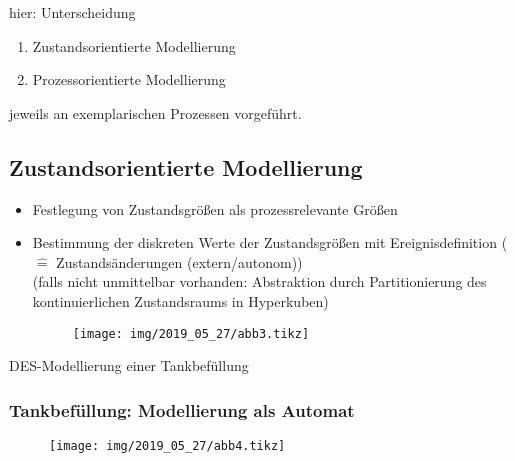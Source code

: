 hier: Unterscheidung
\begin{enumerate}
	\item Zustandsorientierte Modellierung
	\item Prozessorientierte Modellierung
\end{enumerate}
jeweils an exemplarischen Prozessen vorgeführt.

\subsection{Zustandsorientierte Modellierung}
\begin{itemize}
	\item Festlegung von Zustandsgrößen  als prozessrelevante Größen
	\item Bestimmung der diskreten Werte der Zustandsgrößen mit Ereignisdefinition ($\hat{=}$ Zustandsänderungen (extern/autonom))\\
	(falls nicht unmittelbar vorhanden: Abstraktion durch Partitionierung des kontinuierlichen Zustandsraums in Hyperkuben)
	
	\begin{figure}[H]
		\centering
		\texttt{[image: img/2019\_05\_27/abb3.tikz]}
	\end{figure}
\end{itemize}

 DES-Modellierung einer Tankbefüllung 

\subsubsection{Tankbefüllung: Modellierung als Automat}

\begin{figure}[H]
	\centering
	\texttt{[image: img/2019\_05\_27/abb4.tikz]}
\end{figure}

